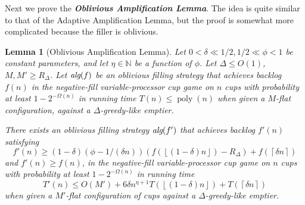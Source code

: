 \documentclass[twocolumn]{article}[10pt]
\newcommand{\defn}[1]{{\textit{\textbf{\boldmath #1}}}\xspace}
\DeclareMathOperator{\poly}{\text{poly}}
\newcommand{\alg}[1]{\textit{\text{alg}}({#1})}
\newcommand{\floor}[1]{\left\lfloor #1 \right\rfloor}
\newcommand{\ceil}[1]{\left\lceil #1 \right\rceil}
\newtheorem{lemma}{Lemma}
\begin{document}
Next we prove the \defn{Oblivious Amplification Lemma}. The idea
is quite similar to that of the Adaptive Amplification Lemma, but the 
proof is somewhat more complicated because the filler is oblivious.
\begin{lemma}[Oblivious Amplification Lemma]
  \label{lem:obliviousAmplification} 
  Let $0 < \delta \ll 1/2, 1/2\ll \phi < 1$ be constant
  parameters, and let $\eta \in \mathbb{N}$ be a function of $\phi$. 
  Let $\Delta \le O(1)$, $M, M' \ge R_\Delta$. 
  Let $\alg{f}$ be an oblivious filling strategy that achieves
  backlog $f(n)$ in the negative-fill variable-processor cup game
  on $n$ cups with probability at least $1-2^{-\Omega(n)}$ in
  running time $T(n) \le \poly(n)$ when given a $M$-flat
  configuration, against a $\Delta$-greedy-like emptier.

  There exists an oblivious filling strategy $\alg{f'}$ that
  achieves backlog $f'(n)$ satisfying 
  $$f'(n) \ge (1-\delta)(\phi-1/(\delta n)) (f(\floor{(1-\delta)n})-R_\Delta) + f(\ceil{\delta n})$$ 
  and $f'(n) \ge f(n)$, in the negative-fill
  variable-processor cup game on $n$ cups with probability at
  least $1-2^{-\Omega(n)}$ in running time $$T'(n) \le O(M') +
  6 \delta n^{\eta+1} T(\floor{(1-\delta)n}) + T(\ceil{\delta n})$$
  when given a $M'$-flat configuration of cups against a
  $\Delta$-greedy-like emptier.
\end{lemma}
\end{document}

